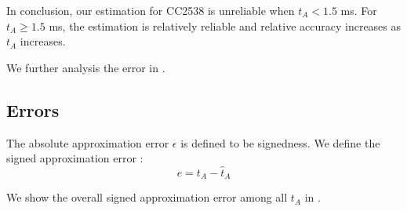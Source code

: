 In conclusion, our estimation for CC2538 is unreliable when $t_A < 1.5$ ms. For $t_A \geq 1.5$ ms, the estimation is relatively reliable and relative accuracy increases as $t_A$ increases.

We further analysis the error in .

\subsection{Errors} \label{ta error}

The absolute approximation error $\epsilon$ is defined to be signedness. We define the signed approximation error :
\begin{equation} \label{Eq: e}
e = t_A - \hat{t}_A
\end{equation}

We show the overall signed approximation error among all $t_A$ in .

